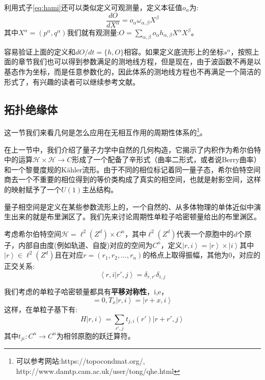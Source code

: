\documentclass[supercite]{HustGraduPaper}
\newcommand{\ket}[1]{\left| #1 \right\rangle}
\newcommand{\bracket}[2]{\left\langle #1|#2 \right\rangle}
\begin{document}
	利用式子\ref{eq:hami}还可以类似定义可观测量，定义本征值$o_\alpha$为:
	\begin{equation}
	\frac{dO}{dX^\alpha} = o_\alpha \omega_{\alpha,\beta} X^\beta
	\end{equation}
	其中$X^\alpha = (p^\alpha,q^\alpha)$我们就有观测量:$O = \sum_{\alpha,\beta} o_\alpha h_{\alpha,\beta} X^\alpha X^\beta$。
	
	容易验证上面的定义和$dO/dt = \{h,O\}$相容。如果定义底流形上的坐标$s^\alpha$，按照上面的章节我们也可以得到参数满足的测地线方程，但是现在，由于波函数不再是以基态作为坐标，而是任意参数化的，因此体系的测地线方程也不再满足一个简洁的形式了，有兴趣的读者可以继续参考文献\cite{minic2004general}。
	\subsection{拓扑绝缘体\label{sub3}}
	这一节我们来看几何是怎么应用在无相互作用的周期性体系的\footnote{可以参考网站:https://topocondmat.org/, http://www.damtp.cam.ac.uk/user/tong/qhe.html}。
	
	在上一节中，我们介绍了量子力学中自然的几何构造，它揭示了内积作为希尔伯特中的运算$\mathcal{H}\times \mathcal{H} \to C$形成了一个配备了辛形式（曲率二形式，或者说Berry曲率）和一个黎曼度规的Kähler流形。由于不同的相位标记着同一量子态，希尔伯特空间商去一个不重要的相位得到的等价类构成了真实的相空间，也就是射影空间，这样的映射赋予了一个$U(1)$主丛结构。
	
	量子相空间是定义在某些参数流形上的，一个自然的、从多体物理的单体近似中演生出来的就是布里渊区了。我们先来讨论周期性单粒子哈密顿量给出的布里渊区。
	
	考虑希尔伯特空间$\mathcal{H} = \ell^2(Z^d) \times C^n$，其中$\ell^2(Z^d)$代表一个原胞中的$d$个原子，内部自由度(例如轨道、自旋)对应的空间为$C^n$，定义$\ket{r,i} = \ket{r} \times\ket{i}$其中$\ket{r} \in \ell^2(Z^d)$且在对应$r = (r_1,r_2,...,r_n)$的格点上取得振幅，其他为$0$，对应的正交关系:
\begin{equation}
\bracket{r,i}{r',j} = \delta_{r,r'} \delta_{i,j}
\end{equation}	

我们考虑的单粒子哈密顿量都具有\textbf{平移对称性}，i,e，
\begin{equation}
[T_x,H] = 0, T_x \ket{r,i} = \ket{r+x,i}
\end{equation}
这样，在单粒子基下有:
\begin{equation}
H \ket{r,i} = \sum_{r',j} t_{j,i}(r')\ket{r+r',j}
\end{equation}
其中$t_{ji}: C^n \to C^n$为相邻原胞的跃迁算符。
\end{document}
